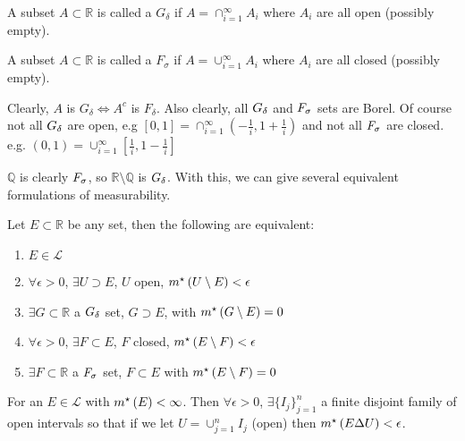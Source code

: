  \begin{definition}
     A subset $A \subset \mathbb{R}$ is called a $G_{\delta}$ if $A = \cap_{i=1}^{\infty} A_i$ where $A_i$ are all open (possibly empty).
 \end{definition}

 \begin{definition}
     A subset $A \subset \mathbb{R}$ is called a $F_\sigma$ if $A = \cup_{i=1}^{\infty} A_i$ where $A_i$ are all closed (possibly empty).
 \end{definition}

 Clearly, $A$ is $G_\delta \iff A^c$ is $F_\delta$.
 Also clearly, all $G_{\delta}$ and $F_{\sigma}$ sets are Borel.
 Of course not all $G_{\delta}$ are open, e.g $[0,1] = \cap_{i=1}^{\infty} \left(- \frac{1}{i}, 1 + \frac{1}{i}\right)$ and not all $F_{\sigma}$ are closed.
 e.g. $(0,1) = \cup_{i=1}^{\infty} \left[\frac{1}{i}, 1-\frac{1}{i}\right]$

$\mathbb{Q}$ is clearly $F_{\sigma}$, so $\mathbb{R} \setminus \mathbb{Q}$ is $G_{\delta}$.
 With this, we can give several equivalent formulations of measurability.

 \begin{theorem}
     Let $E \subset \mathbb{R}$ be any set, then the following are equivalent:
     \begin{enumerate}
         \item $E \in \mathcal{L}$
         \item $\forall \epsilon > 0$, $\exists U \supset E$, $U$ open, $m^{\star}\left(U \setminus E\right) < \epsilon$
         \item $\exists G \subset \mathbb{R}$ a $G_{\delta}$ set, $G \supset E$, with $m^{\star}\left(G \setminus E\right) = 0$
         \item $\forall \epsilon > 0$, $\exists F \subset E$, $F$ closed, $m^{\star}\left(E \setminus F\right) < \epsilon$
         \item $\exists F \subset \mathbb{R}$ a $F_{\sigma}$ set, $F \subset E$ with $m^{\star}\left(E \setminus F\right) = 0$
     \end{enumerate}
 \end{theorem}

 \begin{prop}
     For an $E \in \mathcal{L}$ with $m^{\star}\left(E\right) < \infty$.
     Then $\forall \epsilon > 0$, $\exists \{ I_j \}_{j=1}^{n}$ a finite disjoint family of open intervals so that if we let $U = \cup_{j=1}^{n} I_j$ (open) then $m^{\star}\left(E \Delta U\right) < \epsilon$.
 \end{prop}